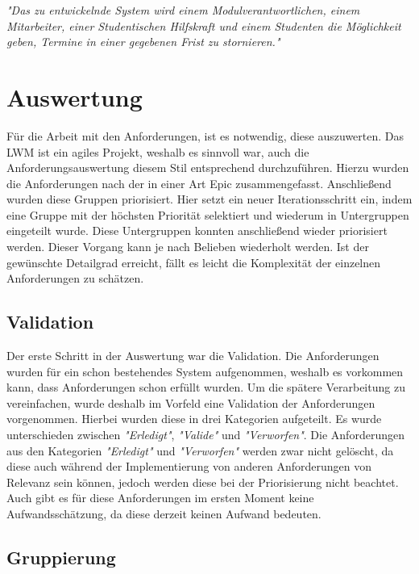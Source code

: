 \textit{"Das zu entwickelnde System wird einem Modulverantwortlichen, einem Mitarbeiter, einer Studentischen Hilfskraft und einem Studenten die Möglichkeit geben, Termine in einer gegebenen Frist zu stornieren."}

\section{Auswertung}
\label{sec:auswertung}

Für die Arbeit mit den Anforderungen, ist es notwendig, diese auszuwerten.
Das \ac{LWM} ist ein agiles Projekt, weshalb es sinnvoll war, auch die Anforderungsauswertung diesem Stil entsprechend durchzuführen. Hierzu wurden die Anforderungen nach der  in einer Art Epic zusammengefasst. Anschließend wurden diese Gruppen priorisiert. Hier setzt ein neuer Iterationsschritt ein, indem eine Gruppe mit der höchsten Priorität selektiert und wiederum in Untergruppen eingeteilt wurde. Diese Untergruppen konnten anschließend wieder priorisiert werden. Dieser Vorgang kann je nach Belieben wiederholt werden. Ist der gewünschte Detailgrad erreicht, fällt es leicht die Komplexität der einzelnen Anforderungen zu schätzen.


\subsection{Validation}
\label{subsec:validation}
Der erste Schritt in der Auswertung war die Validation. Die Anforderungen wurden für ein schon bestehendes System aufgenommen, weshalb es vorkommen kann, dass Anforderungen schon erfüllt wurden. Um die spätere Verarbeitung zu vereinfachen, wurde deshalb im Vorfeld eine Validation der Anforderungen vorgenommen. Hierbei wurden diese in drei Kategorien aufgeteilt. Es wurde unterschieden zwischen \textit{"Erledigt"}, \textit{"Valide"} und \textit{"Verworfen"}. Die Anforderungen aus den Kategorien \textit{"Erledigt"} und \textit{"Verworfen"} werden zwar nicht gelöscht, da diese auch während der Implementierung von anderen Anforderungen von Relevanz sein können, jedoch werden diese bei der Priorisierung nicht beachtet. Auch gibt es für diese Anforderungen im ersten Moment keine Aufwandsschätzung, da diese derzeit keinen Aufwand bedeuten.

\subsection{Gruppierung}

